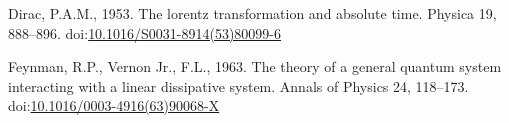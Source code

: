\documentclass[]{elsarticle} %
\newlength{\cslhangindent}
\newlength{\cslentryspacingunit} %
\newenvironment{CSLReferences}[2] %
 {%
  \setlength{\parindent}{0pt}
  \ifodd #1
  \let\oldpar\par
  \def\par{\hangindent=\cslhangindent\oldpar}
  \fi
  \setlength{\parskip}{#2\cslentryspacingunit}
 }%
 {}
\begin{document}
\hypertarget{refs}{}
\begin{CSLReferences}{1}{0}
\leavevmode{}%
Dirac, P.A.M., 1953. The lorentz transformation and absolute time.
Physica 19, 888--896.
doi:\href{https://doi.org/10.1016/S0031-8914(53)80099-6}{10.1016/S0031-8914(53)80099-6}

\leavevmode{}%
Feynman, R.P., Vernon Jr., F.L., 1963. The theory of a general quantum
system interacting with a linear dissipative system. Annals of Physics
24, 118--173.
doi:\href{https://doi.org/10.1016/0003-4916(63)90068-X}{10.1016/0003-4916(63)90068-X}

\end{CSLReferences}
\end{document}
